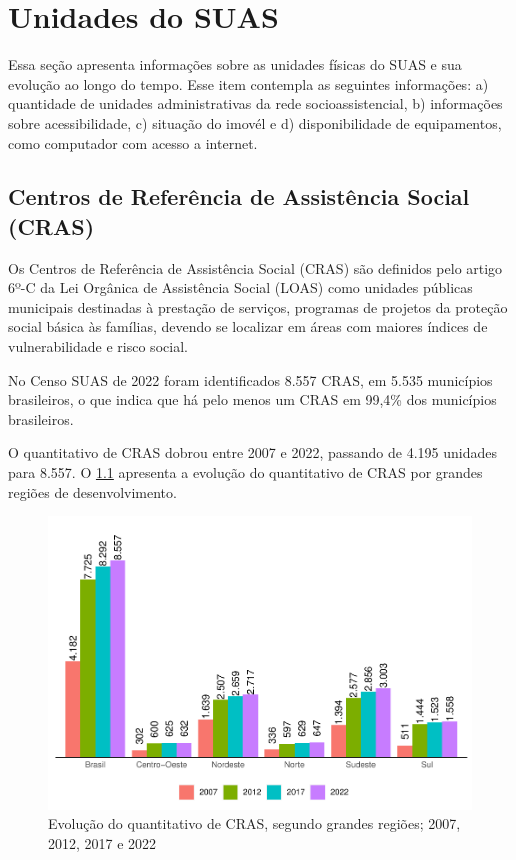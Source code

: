 \documentclass[
  brazilian]{report}
\begin{document}
\hypertarget{unidades-do-suas}{%
\chapter{Unidades do SUAS}\label{unidades-do-suas}}

Essa seção apresenta informações sobre as unidades físicas do SUAS e sua
evolução ao longo do tempo. Esse item contempla as seguintes
informações: a) quantidade de unidades administrativas da rede
socioassistencial, b) informações sobre acessibilidade, c) situação do
imovél e d) disponibilidade de equipamentos, como computador com acesso
a internet.

\hypertarget{centros-de-referuxeancia-de-assistuxeancia-social-cras}{%
\section{Centros de Referência de Assistência Social
(CRAS)}\label{centros-de-referuxeancia-de-assistuxeancia-social-cras}}

Os Centros de Referência de Assistência Social (CRAS) são definidos pelo
artigo 6º-C da Lei Orgânica de Assistência Social (LOAS) como unidades
públicas municipais destinadas à prestação de serviços, programas de
projetos da proteção social básica às famílias, devendo se localizar em
áreas com maiores índices de vulnerabilidade e risco social.

No Censo SUAS de 2022 foram identificados 8.557 CRAS, em 5.535
municípios brasileiros, o que indica que há pelo menos um CRAS em 99,4\%
dos municípios brasileiros.

O quantitativo de CRAS dobrou entre 2007 e 2022, passando de 4.195
unidades para 8.557. O \cref{fig:quantitativo-CRAS} apresenta a evolução
do quantitativo de CRAS por grandes regiões de desenvolvimento.

\begin{figure}
\includegraphics{Censo-SUAS-2022_files/figure-latex/quantitativo-CRAS-1} \caption[Evolução do quantitativo de CRAS, segundo grandes regiões]{Evolução do quantitativo de CRAS, segundo grandes regiões; 2007, 2012, 2017 e 2022}\label{fig:quantitativo-CRAS}
\end{figure}
\end{document}
